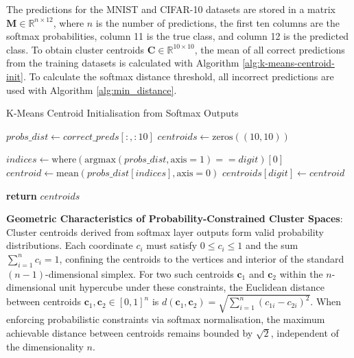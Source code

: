 The predictions for the MNIST and CIFAR-10 datasets are stored in a matrix $\mathbf{M} \in \mathbb{R}^{n \times 12}$, where $n$ is the number of predictions, the first ten columns are the softmax probabilities, column 11 is the true class, and column 12 is the predicted class.
To obtain cluster centroids $\mathbf{C} \in \mathbb{R}^{10 \times 10}$, the mean of all correct predictions from the training datasets is calculated with Algorithm \ref{alg:k-means-centroid-init}. To calculate the softmax distance threshold, all incorrect predictions are used with Algorithm \ref{alg:min_distance}.

\begin{algorithm}
\caption{K-Means Centroid Initialisation from Softmax Outputs}
\label{alg:k-means-centroid-init} 
\begin{algorithmic}[1]

\State $probs\_dist \gets correct\_preds[:, :10]$ 
\State $centroids \gets \text{zeros}((10, 10))$ 

\State $indices \gets \text{where}(\text{argmax}(probs\_dist, \text{axis}=1) == digit)[0]$ 
\State $centroid \gets \text{mean}(probs\_dist[indices], \text{axis}=0)$ 
\State $centroids[digit] \gets centroid$ 
\EndFor

\State \textbf{return} $centroids$
\end{algorithmic}
\end{algorithm}


\textbf{Geometric Characteristics of Probability-Constrained Cluster Spaces}: Cluster centroids derived from softmax layer outputs form valid probability distributions. Each coordinate \( c_i \) must satisfy \( 0 \leq c_i \leq 1 \) and the sum \( \sum_{i=1}^n c_i = 1 \), confining the centroids to the vertices and interior of the standard \((n-1)\)-dimensional simplex. For two such centroids \( \mathbf{c}_1 \) and \( \mathbf{c}_2 \) within the \( n \)-dimensional unit hypercube under these constraints, the Euclidean distance between centroids \( \mathbf{c}_1, \mathbf{c}_2 \in [0,1]^n \) is \( d(\mathbf{c}_1, \mathbf{c}_2) = \sqrt{\sum_{i=1}^{n}\left(c_{1i} - c_{2i}\right)^2} \). When enforcing probabilistic constraints via softmax normalisation, the maximum achievable distance between centroids remains bounded by \(\sqrt{2}\), independent of the dimensionality \( n \).

